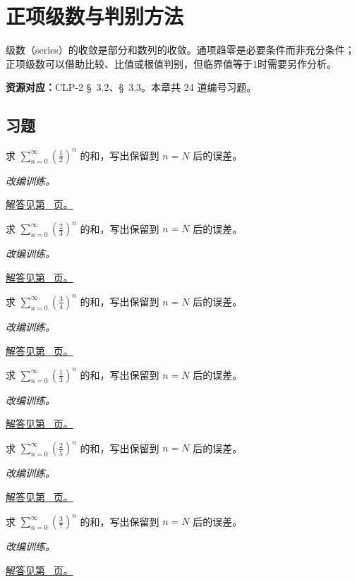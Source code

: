 \documentclass[UTF8,12pt,a4paper,fontset=fandol]{ctexart}
\begin{document}
\clearpage
\section{正项级数与判别方法}\label{sec:ch24}
级数（series）的收敛是部分和数列的收敛。通项趋零是必要条件而非充分条件；正项级数可以借助比较、比值或根值判别，但临界值等于1时需要另作分析。

\textbf{资源对应：}CLP-2 \S~3.2、\S~3.3。本章共 24 道编号习题。
\subsection{习题}
\begin{example}[几何级数与尾项]\label{ex:c24q1}
求 $\displaystyle\sum_{n=0}^\infty(\frac{1}{2})^n$ 的和，写出保留到 $n=N$ 后的误差。
\par\textit{改编训练。}\par\hyperref[ans:c24q1]{解答见第~\pageref{ans:c24q1} 页。}
\end{example}
\begin{example}[几何级数与尾项]\label{ex:c24q2}
求 $\displaystyle\sum_{n=0}^\infty(\frac{2}{3})^n$ 的和，写出保留到 $n=N$ 后的误差。
\par\textit{改编训练。}\par\hyperref[ans:c24q2]{解答见第~\pageref{ans:c24q2} 页。}
\end{example}
\begin{example}[几何级数与尾项]\label{ex:c24q3}
求 $\displaystyle\sum_{n=0}^\infty(\frac{3}{4})^n$ 的和，写出保留到 $n=N$ 后的误差。
\par\textit{改编训练。}\par\hyperref[ans:c24q3]{解答见第~\pageref{ans:c24q3} 页。}
\end{example}
\begin{example}[几何级数与尾项]\label{ex:c24q4}
求 $\displaystyle\sum_{n=0}^\infty(\frac{1}{3})^n$ 的和，写出保留到 $n=N$ 后的误差。
\par\textit{改编训练。}\par\hyperref[ans:c24q4]{解答见第~\pageref{ans:c24q4} 页。}
\end{example}
\begin{example}[几何级数与尾项]\label{ex:c24q5}
求 $\displaystyle\sum_{n=0}^\infty(\frac{2}{5})^n$ 的和，写出保留到 $n=N$ 后的误差。
\par\textit{改编训练。}\par\hyperref[ans:c24q5]{解答见第~\pageref{ans:c24q5} 页。}
\end{example}
\begin{example}[几何级数与尾项]\label{ex:c24q6}
求 $\displaystyle\sum_{n=0}^\infty(\frac{3}{7})^n$ 的和，写出保留到 $n=N$ 后的误差。
\par\textit{改编训练。}\par\hyperref[ans:c24q6]{解答见第~\pageref{ans:c24q6} 页。}
\end{example}
\end{document}
